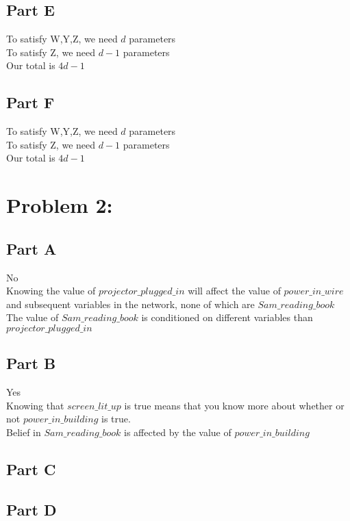 \documentclass[twoside,11pt]{article}
\theoremstyle{definition}
\begin{document}
\subsection*{Part E}

To satisfy W,Y,Z, we need $d$ parameters\\
To satisfy Z, we need $d-1$ parameters\\
Our total is $4d-1$ 

\subsection*{Part F}

To satisfy W,Y,Z, we need $d$ parameters\\
To satisfy Z, we need $d-1$ parameters\\
Our total is $4d-1$ 

\section*{Problem 2:}

\subsection*{Part A}
No\\
Knowing the value of $\textit{projector\_plugged\_in}$ will affect the value of $\textit{power\_in\_wire}$ and subsequent variables in the network, none of which are $\textit{Sam\_reading\_book}$\\
The value of $\textit{Sam\_reading\_book}$ is conditioned on different variables than $\textit{projector\_plugged\_in}$

\subsection*{Part B}

Yes\\
Knowing that $\textit{screen\_lit\_up}$ is true means that you know more about whether or not $\textit{power\_in\_building}$ is true. \\
Belief in $\textit{Sam\_reading\_book}$ is affected by the value of $\textit{power\_in\_building}$

\subsection*{Part C}

\subsection*{Part D}
\end{document}
